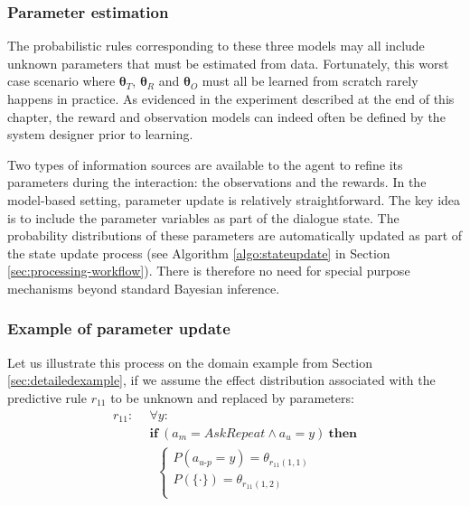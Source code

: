 \subsubsection*{Parameter estimation}
The probabilistic rules corresponding to these three models may all include unknown parameters that must be estimated from data.  Fortunately, this worst case scenario where $\boldsymbol\theta_T$, $\boldsymbol\theta_R$ and $\boldsymbol\theta_O$ must all be learned from scratch rarely happens in practice. As evidenced in the experiment described at the end of this chapter, the reward and observation models can indeed often be defined by the system designer prior to learning. 

Two types of information sources are available to the agent to refine its parameters during the interaction: the observations and the rewards.  In the model-based setting, parameter update is relatively straightforward.  The key idea is to include the parameter variables as part of the dialogue state.  The probability distributions of these parameters are automatically updated as part of the state update process (see Algorithm \ref{algo:stateupdate} in Section \ref{sec:processing-workflow}). There is therefore no need for special purpose mechanisms beyond standard Bayesian inference.

\subsubsection*{Example of parameter update}

Let us illustrate this process on the domain example from Section \ref{sec:detailedexample}, if we assume the effect distribution associated with the predictive rule $r_{11}$ to be unknown and replaced by parameters: 
\begin{align*}
r_{11}: \ \ & \forall y: \\ 
& \textbf{if} \ (a_m = \mathit{AskRepeat} \land a_u=y) \ \textbf{then} \\ 
& \; \;  \begin{cases} 
P(a_{u\mbox{-}p} = y) = \theta_{r_{11}(1,1)} \\ 
P(\{\cdot\}) = \theta_{r_{11}(1,2)} \\ 
\end{cases}
\end{align*}


